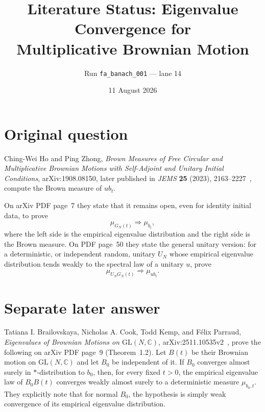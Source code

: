 \documentclass[11pt]{article}
\title{Literature Status: Eigenvalue Convergence for\\
Multiplicative Brownian Motion}
\author{Run \texttt{fa\_banach\_001} --- lane 14}
\date{11 August 2026}
\begin{document}
\maketitle

\begin{center}
\end{center}

\section{Original question}

Ching-Wei Ho and Ping Zhong, \emph{Brown Measures of Free Circular and
Multiplicative Brownian Motions with Self-Adjoint and Unitary Initial
Conditions}, arXiv:1908.08150, later published in \emph{JEMS}
\textbf{25} (2023), 2163--2227~\cite{source}, compute the Brown measure of
$ub_t$.

On arXiv PDF page~7 they state that it remains open, even for identity
initial data, to prove
\[
  \mu_{G_N(t)} \Longrightarrow \mu_{b_t},
\]
where the left side is the empirical eigenvalue distribution and the right
side is the Brown measure.  On PDF page~50 they state the general unitary
version: for a deterministic, or independent random, unitary $U_N$ whose
empirical eigenvalue distribution tends weakly to the spectral law of a
unitary $u$, prove
\[
  \mu_{U_NG_N(t)} \Longrightarrow \mu_{ub_t}.
\]

\section{Separate later answer}

Tatiana I. Brailovskaya, Nicholas A. Cook, Todd Kemp, and F\'elix Parraud,
\emph{Eigenvalues of Brownian Motions on $\mathrm{GL}(N,\mathbb C)$},
arXiv:2511.10535v2~\cite{answerpaper}, prove the following on arXiv PDF
page~9 (Theorem~1.2).  Let $B(t)$ be their Brownian motion on
$\mathrm{GL}(N,\mathbb C)$ and let $B_0$ be independent of it.  If $B_0$
converges almost surely in $*$-distribution to $b_0$, then, for every fixed
$t>0$, the empirical eigenvalue law of $B_0B(t)$ converges weakly almost
surely to a deterministic measure $\mu_{b_0,t}$.  They explicitly note that
for normal $B_0$, the hypothesis is simply weak convergence of its empirical
eigenvalue distribution.
\end{document}
